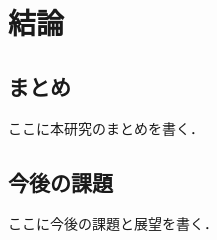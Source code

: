 \chapter{結論}\label{chap:conclusion}

\section{まとめ}
ここに本研究のまとめを書く．

\section{今後の課題}
ここに今後の課題と展望を書く．

\clearpage
